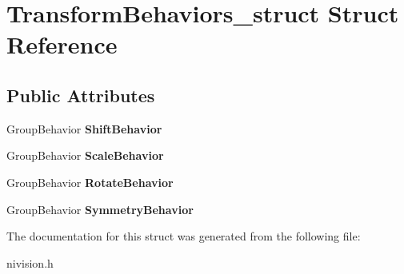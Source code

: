 \hypertarget{structTransformBehaviors__struct}{\section{\-Transform\-Behaviors\-\_\-struct \-Struct \-Reference}
\label{structTransformBehaviors__struct}
}
\subsection*{\-Public \-Attributes}
\begin{DoxyCompactItemize}
\item 
\hypertarget{structTransformBehaviors__struct_a8e22bb385ce42ea44a92fe9b95450a02}{\-Group\-Behavior {\bfseries \-Shift\-Behavior}}\label{structTransformBehaviors__struct_a8e22bb385ce42ea44a92fe9b95450a02}

\item 
\hypertarget{structTransformBehaviors__struct_a470c01437e04d4d7f9324be1235ce5e5}{\-Group\-Behavior {\bfseries \-Scale\-Behavior}}\label{structTransformBehaviors__struct_a470c01437e04d4d7f9324be1235ce5e5}

\item 
\hypertarget{structTransformBehaviors__struct_a16025dbb991919688226e853f1ff9e62}{\-Group\-Behavior {\bfseries \-Rotate\-Behavior}}\label{structTransformBehaviors__struct_a16025dbb991919688226e853f1ff9e62}

\item 
\hypertarget{structTransformBehaviors__struct_a2d0c649ee887f6c1dccd57898997cf9b}{\-Group\-Behavior {\bfseries \-Symmetry\-Behavior}}\label{structTransformBehaviors__struct_a2d0c649ee887f6c1dccd57898997cf9b}

\end{DoxyCompactItemize}


\-The documentation for this struct was generated from the following file\-:\begin{DoxyCompactItemize}
\item 
nivision.\-h\end{DoxyCompactItemize}
